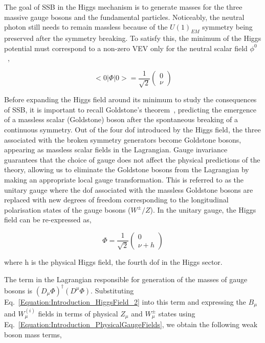 The goal of SSB in the Higgs mechanism is to generate masses for the three massive gauge bosons and the fundamental particles.  Noticeably, the neutral photon still needs to remain massless because of the $U(1)_{EM}$ symmetry being preserved after the symmetry breaking. To satisfy this, the minimum of the Higgs potential must correspond to a non-zero VEV only for the neutral scalar field $\phi^{0}$~\cite{Higgs_VacuumState_Choice},

\begin{equation}
    <0|\Phi|0> = \frac{1}{\sqrt{2}} \begin{pmatrix}
        0 \\
        \nu
    \end{pmatrix}
\end{equation}
 
Before expanding the Higgs field around its minimum to study the consequences of SSB, it is important to recall Goldstone's theorem~\cite{Goldstone}, predicting the emergence of a massless scalar (Goldstone) boson after the spontaneous breaking of a continuous symmetry. Out of the four dof introduced by the Higgs field, the three associated with the broken symmetry generators become Goldstone bosons, appearing as massless scalar fields in the Lagrangian. Gauge invariance guarantees that the choice of gauge does not affect the physical predictions of the theory, allowing us to eliminate the Goldstone bosons from the Lagrangian by making an appropriate local gauge transformation. This is referred to as the unitary gauge where the dof associated with the massless Goldstone bosons are replaced with new degrees of freedom corresponding to the longitudinal polarisation states of the gauge bosons ($W^{\pm}/Z$). In the unitary gauge, the Higgs field can be re-expressed as,

\begin{equation}
    \Phi = \frac{1}{\sqrt{2}}\begin{pmatrix}
        0 \\
        \nu + h
    \end{pmatrix} 
    \label{Equation:Introduction_HiggsField_2}
\end{equation}

where h is the physical Higgs field, the fourth dof in the Higgs sector.

The term in the Lagrangian responsible for generation of the masses of gauge bosons is $(D_\mu\Phi)^\dagger(D^\mu\Phi)$. Substituting Eq.~\ref{Equation:Introduction_HiggsField_2} into this term and expressing the $B_\mu$ and $W_{\mu}^{(i)}$ fields in terms of physical $Z_\mu$ and $W_{\mu}^{\pm}$ states using Eq.~\ref{Equation:Introduction_PhysicalGaugeFields}, we obtain the following weak boson mass terms,

